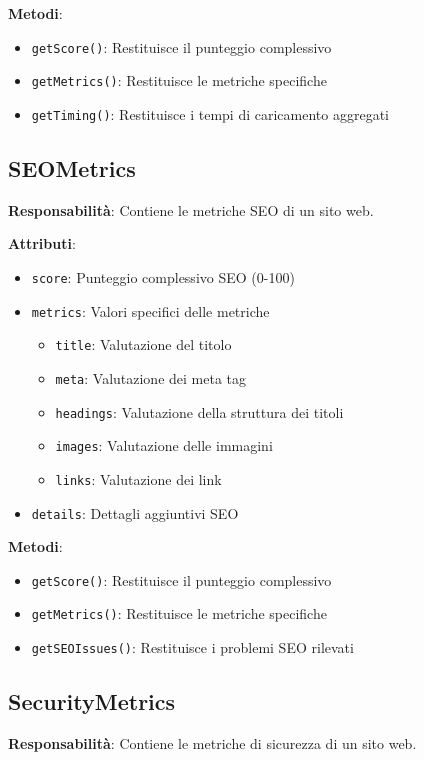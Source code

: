 {{{{{{{\textbf{Metodi}:
\begin{itemize}
    \item \texttt{getScore()}: Restituisce il punteggio complessivo
    \item \texttt{getMetrics()}: Restituisce le metriche specifiche
    \item \texttt{getTiming()}: Restituisce i tempi di caricamento aggregati
\end{itemize}

\subsection{SEOMetrics}
\textbf{Responsabilità}: Contiene le metriche SEO di un sito web.

\textbf{Attributi}:
\begin{itemize}
    \item \texttt{score}: Punteggio complessivo SEO (0-100)
    \item \texttt{metrics}: Valori specifici delle metriche
    \begin{itemize}
        \item \texttt{title}: Valutazione del titolo
        \item \texttt{meta}: Valutazione dei meta tag
        \item \texttt{headings}: Valutazione della struttura dei titoli
        \item \texttt{images}: Valutazione delle immagini
        \item \texttt{links}: Valutazione dei link
    \end{itemize}
    \item \texttt{details}: Dettagli aggiuntivi SEO
\end{itemize}

\textbf{Metodi}:
\begin{itemize}
    \item \texttt{getScore()}: Restituisce il punteggio complessivo
    \item \texttt{getMetrics()}: Restituisce le metriche specifiche
    \item \texttt{getSEOIssues()}: Restituisce i problemi SEO rilevati
\end{itemize}

\subsection{SecurityMetrics}
\textbf{Responsabilità}: Contiene le metriche di sicurezza di un sito web.

}}}}}}}
